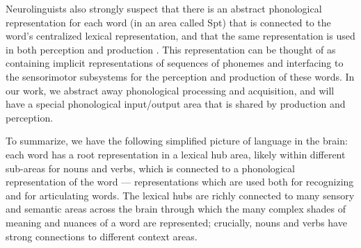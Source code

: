 \documentclass{article}
\begin{document}
Neurolinguists also strongly suspect that there is an abstract phonological representation for each word (in an area called Spt) that is connected to the word's centralized lexical representation, and that the same representation is used in both perception and production \cite{Hicock2003, OKADA2006112}. This representation can be thought of as containing implicit representations of sequences of phonemes and interfacing to the sensorimotor subsystems for the perception and production of these words. In our work, we abstract away phonological processing and acquisition, and will have a special phonological input/output area that is shared by production and perception.

To summarize, we have the following simplified picture of language in the brain: each word has a root representation in a lexical hub area, likely within different sub-areas for nouns and verbs, which is connected to a phonological representation of the word --- representations which are used both for recognizing and for articulating words.  The lexical hubs are richly connected to many sensory and semantic areas across the brain through which the many complex shades of meaning and nuances of a word are represented; crucially, nouns and verbs have strong connections to different context areas. 

\end{document}
